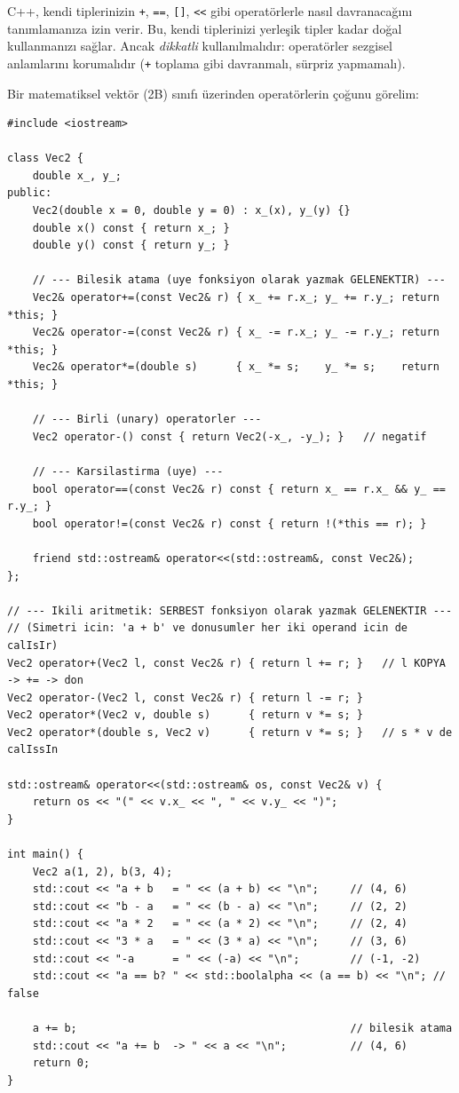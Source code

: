 \documentclass[11pt,a4paper]{article}
\newcommand{\code}[1]{\texttt{\color{koyuGri}#1}}
\begin{document}
C++, kendi tiplerinizin \code{+}, \code{==}, \code{[]}, \code{<<} gibi
operatörlerle nasıl davranacağını tanımlamanıza izin verir. Bu, kendi
tiplerinizi yerleşik tipler kadar doğal kullanmanızı sağlar. Ancak
\emph{dikkatli} kullanılmalıdır: operatörler sezgisel anlamlarını korumalıdır
(\code{+} toplama gibi davranmalı, sürpriz yapmamalı).

Bir matematiksel vektör (2B) sınıfı üzerinden operatörlerin çoğunu görelim:

\begin{lstlisting}
#include <iostream>

class Vec2 {
    double x_, y_;
public:
    Vec2(double x = 0, double y = 0) : x_(x), y_(y) {}
    double x() const { return x_; }
    double y() const { return y_; }

    // --- Bilesik atama (uye fonksiyon olarak yazmak GELENEKTIR) ---
    Vec2& operator+=(const Vec2& r) { x_ += r.x_; y_ += r.y_; return *this; }
    Vec2& operator-=(const Vec2& r) { x_ -= r.x_; y_ -= r.y_; return *this; }
    Vec2& operator*=(double s)      { x_ *= s;    y_ *= s;    return *this; }

    // --- Birli (unary) operatorler ---
    Vec2 operator-() const { return Vec2(-x_, -y_); }   // negatif

    // --- Karsilastirma (uye) ---
    bool operator==(const Vec2& r) const { return x_ == r.x_ && y_ == r.y_; }
    bool operator!=(const Vec2& r) const { return !(*this == r); }

    friend std::ostream& operator<<(std::ostream&, const Vec2&);
};

// --- Ikili aritmetik: SERBEST fonksiyon olarak yazmak GELENEKTIR ---
// (Simetri icin: 'a + b' ve donusumler her iki operand icin de calIsIr)
Vec2 operator+(Vec2 l, const Vec2& r) { return l += r; }   // l KOPYA -> += -> don
Vec2 operator-(Vec2 l, const Vec2& r) { return l -= r; }
Vec2 operator*(Vec2 v, double s)      { return v *= s; }
Vec2 operator*(double s, Vec2 v)      { return v *= s; }   // s * v de calIssIn

std::ostream& operator<<(std::ostream& os, const Vec2& v) {
    return os << "(" << v.x_ << ", " << v.y_ << ")";
}

int main() {
    Vec2 a(1, 2), b(3, 4);
    std::cout << "a + b   = " << (a + b) << "\n";     // (4, 6)
    std::cout << "b - a   = " << (b - a) << "\n";     // (2, 2)
    std::cout << "a * 2   = " << (a * 2) << "\n";     // (2, 4)
    std::cout << "3 * a   = " << (3 * a) << "\n";     // (3, 6)
    std::cout << "-a      = " << (-a) << "\n";        // (-1, -2)
    std::cout << "a == b? " << std::boolalpha << (a == b) << "\n"; // false

    a += b;                                           // bilesik atama
    std::cout << "a += b  -> " << a << "\n";          // (4, 6)
    return 0;
}
\end{lstlisting}
\end{document}
